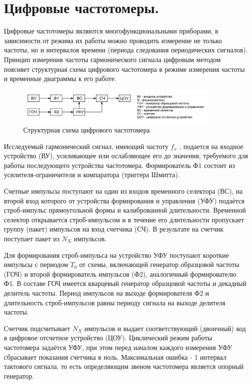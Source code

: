\documentclass[unicode, 12pt, a4paper, oneside]{article}
\begin{document}
\section{Цифровые частотомеры.}

Цифровые частотомеры являются многофункциональными приборами, в зависимости от режима их работы можно проводить измерение не только частоты, но и интервалов времени (периода следования периодических сигналов). Принцип измерения частоты гармонического сигнала цифровым методом поясняет структурная схема цифрового частотомера в режиме измерения частоты и временные диаграммы к его работе.
\begin{figure}[H]
\centering
\includegraphics[width=0.9\textwidth]{53.jpg}
\caption{Структурная схема цифрового частотомера}
\end{figure}

Исследуемый гармонический сигнал, имеющий частоту $f_x$ , подается на входное устройство (ВУ), усиливающее или ослабляющее его до значения, требуемого для работы последующего устройства частотомера. Формирователь Ф1 состоит из усилителя-ограничителя и компаратора (триггера Шмитта).

Счетные импульсы поступают на один из входов временного селектора (ВС), на второй вход которого от устройства формирования и управления (УФУ) подаётся строб-импульс прямоугольной формы и калиброванной длительности. Временной селектор открывается строб-импульсом  и в течение его длительности пропускает группу (пакет) импульсов на вход счетчика (СЧ). В результате на счетчик поступает пакет из $N_X$ импульсов.

Для формирования строб-импульса на устройство УФУ поступают короткие импульсы с периодом $T_0$ от схемы, включающей генератор образцовой частоты (ГОЧ) и второй формирователь импульсов (Ф2), аналогичный формирователю Ф1. В составе ГОЧ имеется кварцевый генератор образцовой частоты и декадный делитель частоты. Период импульсов на выходе формирователя Ф2 и длительность строб-импульсов равны периоду сигнала на выходе делителя частоты.

Счетчик подсчитывает $N_X$ импульсов и выдает соответствующий (двоичный) код в цифровое отсчетное устройство (ЦОУ). Циклический режим работы частотомера задаётся УФУ, при этом перед началом каждого измерения УФУ сбрасывает показания счетчика в ноль. Максимальная ошибка - 1 интервал тактового сигнала, то есть определяющим звеном частотомера является опорный генератор.
\end{document}

